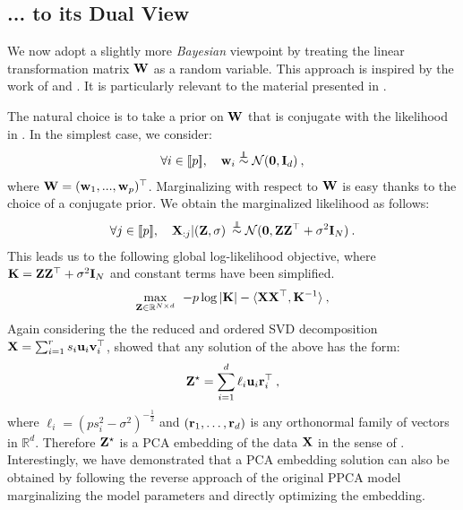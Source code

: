 \subsection{... to its Dual View}\label{sec:dual_view}

We now adopt a slightly more \textit{Bayesian} viewpoint by treating the linear transformation matrix ${\mathbf{W}}$ as a random variable. This approach is inspired by the work of \cite{lawrence2005probabilistic} and \cite{bishop1998bayesian}. It is particularly relevant to the material presented in .

The natural choice is to take a prior on ${\mathbf{W}}$ that is conjugate with the likelihood in . In the simplest case, we consider:
\begin{align}
     \forall i \in {[\![p]\!]}, \quad {\mathbf{w}}_i \stackrel{\perp\!\!\!\!\perp}{\sim} \mathcal{N}(\bm{0}, {\mathbf{I}}_d) \:,
\end{align}
where ${\mathbf{W}} = ({\mathbf{w}}_1, ..., {\mathbf{w}}_p)^\top$. Marginalizing with respect to ${\mathbf{W}}$ is easy thanks to the choice of a conjugate prior. We obtain the marginalized likelihood as follows:
\begin{align}
    \forall j \in {[\![p]\!]}, \quad {\mathbf{X}}_{:j} | ({\mathbf{Z}}, \sigma) \: \stackrel{\perp\!\!\!\!\perp}{\sim} \mathcal{N}(\bm{0}, {\mathbf{Z}} {\mathbf{Z}}^\top + \sigma^2 {\mathbf{I}}_N) \:.
\end{align}
This leads us to the following global log-likelihood objective, where ${\mathbf{K}} = {\mathbf{Z}} {\mathbf{Z}}^\top + \sigma^2 {\mathbf{I}}_N$ and constant terms have been simplified.
\begin{align}
    \max_{{\mathbf{Z}} \in \mathbb{R}^{N \times d}} \:\: -p \log |{\mathbf{K}}| - \langle {\mathbf{X}} {\mathbf{X}}^\top, {\mathbf{K}}^{-1} \rangle \:,
\end{align}
Again considering the the reduced and ordered SVD decomposition ${\mathbf{X}} = \sum_{i=1}^{r} s_i {\mathbf{u}}_i {\mathbf{v}}_i^\top$, \cite{lawrence2005probabilistic} showed that any solution of the above has the form:
\begin{align}
    {\mathbf{Z}}^\star = \sum_{i=1}^d \ell_i {\mathbf{u}}_i {\mathbf{r}}_i^\top \:,
\end{align}
where $\ell_i = (p s_i^2 - \sigma^2)^{-\frac{1}{2}}$ and $({\mathbf{r}}_1, \dots, {\mathbf{r}}_d)$ is any orthonormal family of vectors in $\mathbb{R}^d$.
Therefore ${\mathbf{Z}}^{\star}$ is a PCA embedding of the data ${\mathbf{X}}$ in the sense of . Interestingly, we have demonstrated that a PCA embedding solution can also be obtained by following the reverse approach of the original PPCA model \ie marginalizing the model parameters and directly optimizing the embedding.

